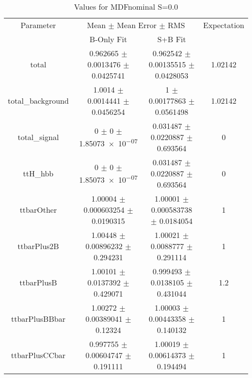\begin{table}
\centering
\caption{Values for MDFnominal S=0.0}
\begin{tabular}{cccc}
\toprule
Parameter & \multicolumn{2}{c}{Mean $\pm$ Mean Error $\pm$ RMS} & Expectation\\
 & B-Only Fit & S+B Fit & \\
\midrule
total & \num{0.962665} $\pm$ \num{0.0013476} $\pm$ \num{0.0425741} & \num{0.962542} $\pm$ \num{0.00135515} $\pm$ \num{0.0428053} & \num{1.02142}\\
total\_background & \num{1.0014} $\pm$ \num{0.0014441} $\pm$ \num{0.0456254} & \num{1} $\pm$ \num{0.00177863} $\pm$ \num{0.0561498} & \num{1.02142}\\
total\_signal & \num{0} $\pm$ \num{0} $\pm$ \num{1.85073e-07} & \num{0.031487} $\pm$ \num{0.0220887} $\pm$ \num{0.693564} & \num{0}\\
ttH\_hbb & \num{0} $\pm$ \num{0} $\pm$ \num{1.85073e-07} & \num{0.031487} $\pm$ \num{0.0220887} $\pm$ \num{0.693564} & \num{0}\\
ttbarOther & \num{1.00004} $\pm$ \num{0.000603254} $\pm$ \num{0.0190315} & \num{1.00001} $\pm$ \num{0.000583738} $\pm$ \num{0.0184054} & \num{1}\\
ttbarPlus2B & \num{1.00448} $\pm$ \num{0.00896232} $\pm$ \num{0.294231} & \num{1.00021} $\pm$ \num{0.0088777} $\pm$ \num{0.291114} & \num{1}\\
ttbarPlusB & \num{1.00101} $\pm$ \num{0.0137392} $\pm$ \num{0.429071} & \num{0.999493} $\pm$ \num{0.0138105} $\pm$ \num{0.431044} & \num{1.2}\\
ttbarPlusBBbar & \num{1.00272} $\pm$ \num{0.00389041} $\pm$ \num{0.12324} & \num{1.00003} $\pm$ \num{0.00443358} $\pm$ \num{0.140132} & \num{1}\\
ttbarPlusCCbar & \num{0.997755} $\pm$ \num{0.00604747} $\pm$ \num{0.191111} & \num{1.00019} $\pm$ \num{0.00614373} $\pm$ \num{0.194494} & \num{1}\\
\bottomrule
\end{tabular}
\end{table}